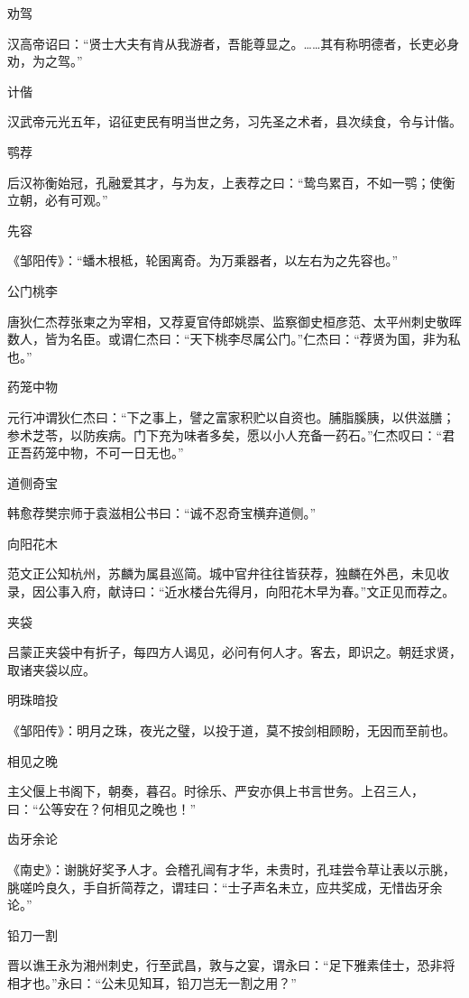 \documentclass[a4paper,12pt,UTF8,twoside]{ctexbook}
\begin{document}
    劝驾
    
    汉高帝诏曰：“贤士大夫有肯从我游者，吾能尊显之。……其有称明德者，长吏必身劝，为之驾。”
    
    计偕
    
    汉武帝元光五年，诏征吏民有明当世之务，习先圣之术者，县次续食，令与计偕。
    
    鹗荐
    
    后汉祢衡始冠，孔融爱其才，与为友，上表荐之曰：“鸷鸟累百，不如一鹗；使衡立朝，必有可观。”
    
    先容
    
    《邹阳传》：“蟠木根柢，轮囷离奇。为万乘器者，以左右为之先容也。”
    
    公门桃李
    
    唐狄仁杰荐张柬之为宰相，又荐夏官侍郎姚崇、监察御史桓彦范、太平州刺史敬晖数人，皆为名臣。或谓仁杰曰：“天下桃李尽属公门。”仁杰曰：“荐贤为国，非为私也。”
    
    药笼中物
    
    元行冲谓狄仁杰曰：“下之事上，譬之富家积贮以自资也。脯脂膎胰，以供滋膳；参术芝苓，以防疾病。门下充为味者多矣，愿以小人充备一药石。”仁杰叹曰：“君正吾药笼中物，不可一日无也。”
    
    道侧奇宝
    
    韩愈荐樊宗师于袁滋相公书曰：“诚不忍奇宝横弃道侧。”
    
    向阳花木
    
    范文正公知杭州，苏麟为属县巡简。城中官弁往往皆获荐，独麟在外邑，未见收录，因公事入府，献诗曰：“近水楼台先得月，向阳花木早为春。”文正见而荐之。
    
    夹袋
    
    吕蒙正夹袋中有折子，每四方人谒见，必问有何人才。客去，即识之。朝廷求贤，取诸夹袋以应。
    
    明珠暗投
    
    《邹阳传》：明月之珠，夜光之璧，以投于道，莫不按剑相顾盼，无因而至前也。
    
    相见之晚
    
    主父偃上书阁下，朝奏，暮召。时徐乐、严安亦俱上书言世务。上召三人，曰：“公等安在？何相见之晚也！”
    
    齿牙余论
    
    《南史》：谢朓好奖予人才。会稽孔闿有才华，未贵时，孔珪尝令草让表以示朓，朓嗟吟良久，手自折简荐之，谓珪曰：“士子声名未立，应共奖成，无惜齿牙余论。”
    
    铅刀一割
    
    晋以谯王永为湘州刺史，行至武昌，敦与之宴，谓永曰：“足下雅素佳士，恐非将相才也。”永曰：“公未见知耳，铅刀岂无一割之用？”
    
\end{document}
